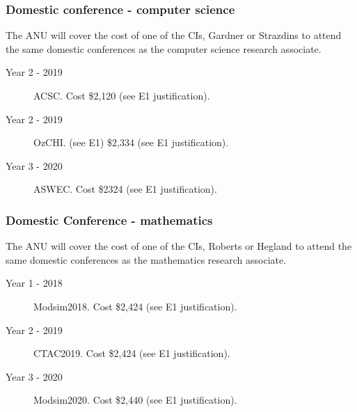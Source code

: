 \documentclass[a4paper,fontsize=12pt]{scrartcl}
\begin{document}
\subsubsection*{Domestic conference - computer science}

The ANU will cover the cost of one of the CIs, Gardner or Strazdins 
to attend the  same domestic conferences as the computer science 
research associate. 


\begin{description}
\item[Year 2 - 2019] ACSC. Cost \$2,120  (see E1 justification).

\item[Year 2 - 2019] OzCHI. (see E1) \$2,334 (see E1 justification).

\item[Year 3 -  2020] ASWEC.  Cost \$2324 (see E1 justification).

\end{description}

\subsubsection*{Domestic Conference - mathematics}

The ANU will cover the cost of one of the CIs, Roberts or Hegland 
to attend the  same domestic conferences as the mathematics 
research associate. 


\begin{description}
\item[Year 1 - 2018] Modsim2018. Cost \$2,424  (see E1 justification).

\item[Year 2 - 2019] CTAC2019. Cost \$2,424  (see E1 justification).

\item[Year 3 - 2020] Modsim2020.  Cost \$2,440  (see E1 justification).


\end{description}
\end{document}
